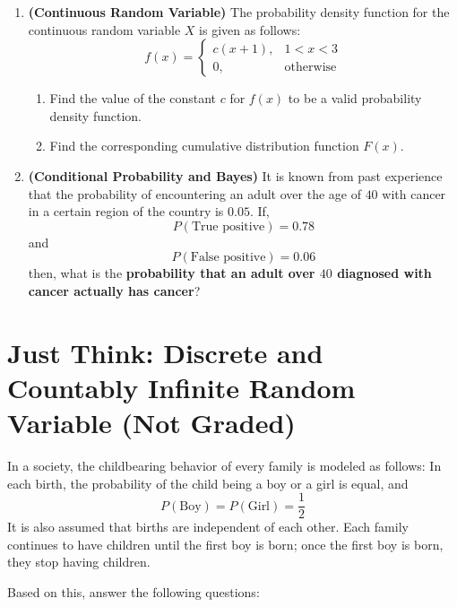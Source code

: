 \documentclass[12pt,a4paper]{article}
\begin{document}
\begin{enumerate}
\newpage

\item \textbf{(Continuous Random Variable)} The probability density function for the continuous random variable $X$ is given as follows:
\[
f(x)=
\begin{cases}
c(x+1), & 1<x<3 \\
0, & \text{otherwise}
\end{cases}
\]
\begin{enumerate}
\item Find the value of the constant $c$ for $f(x)$ to be a valid probability density function.
\item Find the corresponding cumulative distribution function $F(x)$.
\end{enumerate}

\vspace{0.5cm}

\item \textbf{(Conditional Probability and Bayes)} It is known from past experience that the probability of encountering an adult over the age of $40$ with cancer in a certain region of the country is $0.05$. If,
\[
P(\text{True positive}) = 0.78
\]
and
\[
P(\text{False positive}) = 0.06
\]
then, what is the \textbf{probability that an adult over $40$ diagnosed with cancer actually has cancer}?
\end{enumerate}

\vspace{1cm}
\section*{\textbf{\color{TitleColor}Just Think: Discrete and Countably Infinite Random Variable (Not Graded)}}

In a society, the childbearing behavior of every family is modeled as follows: In each birth, the probability of the child being a boy or a girl is equal, and
\[
P(\text{Boy}) = P(\text{Girl}) = \frac{1}{2}
\]
It is also assumed that births are independent of each other. Each family continues to have children until the first boy is born; once the first boy is born, they stop having children.

Based on this, answer the following questions:
\end{document}
